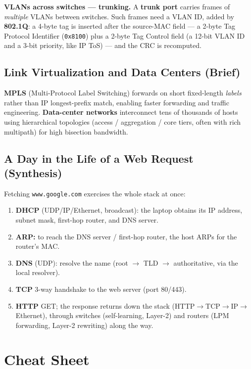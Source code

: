 \documentclass[hidelinks]{article}
\begin{document}
\textbf{VLANs across switches --- trunking.} A \textbf{trunk port} carries
frames of \emph{multiple} VLANs between switches. Such frames need a VLAN ID,
added by \textbf{802.1Q}: a 4-byte tag is inserted after the source-MAC field
--- a 2-byte Tag Protocol Identifier (\texttt{0x8100}) plus a 2-byte Tag
Control field (a 12-bit VLAN ID and a 3-bit priority, like IP ToS) --- and the
CRC is recomputed.

\subsection{Link Virtualization and Data Centers (Brief)}

\textbf{MPLS} (Multi-Protocol Label Switching) forwards on short fixed-length
\emph{labels} rather than IP longest-prefix match, enabling faster forwarding
and traffic engineering. \textbf{Data-center networks} interconnect tens of
thousands of hosts using hierarchical topologies (access / aggregation / core
tiers, often with rich multipath) for high bisection bandwidth.

\subsection{A Day in the Life of a Web Request (Synthesis)}

Fetching \texttt{www.google.com} exercises the whole stack at once:
\begin{enumerate}
    \item \textbf{DHCP} (UDP/IP/Ethernet, broadcast): the laptop obtains its IP
    address, subnet mask, first-hop router, and DNS server.
    \item \textbf{ARP:} to reach the DNS server / first-hop router, the host
    ARPs for the router's MAC.
    \item \textbf{DNS} (UDP): resolve the name (root $\to$ TLD $\to$
    authoritative, via the local resolver).
    \item \textbf{TCP} 3-way handshake to the web server (port 80/443).
    \item \textbf{HTTP} GET; the response returns down the stack
    (HTTP$\to$TCP$\to$IP$\to$Ethernet), through switches (self-learning,
    Layer-2) and routers (LPM forwarding, Layer-2 rewriting) along the way.
\end{enumerate}

\section{Cheat Sheet}
\end{document}

